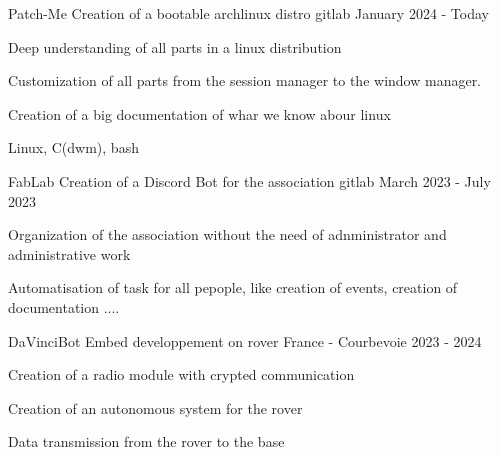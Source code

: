 

\begin{cventries}

	\cventry
	{Patch-Me} %
	{Creation of a bootable archlinux distro} %
	{gitlab} %
	{January 2024 - Today} %
	{
		\begin{cvitems} %
			\item {Deep  understanding of all parts in a linux distribution}
			\item {Customization of all parts from the session manager to the window manager.}
			\item {Creation of a big documentation of whar we know abour linux}
		\end{cvitems}
	}
	{
		\begin{cvitemsskills} %
			\item {Linux, C(dwm), bash}
		\end{cvitemsskills}
	}


	\cventry
	{FabLab} %
	{Creation of a Discord Bot for the association} %
	{gitlab} %
	{March 2023 - July 2023} %
	{
		\begin{cvitems} %
			\item {Organization of the association without the need of adnministrator and administrative work}
			\item {Automatisation of task for all pepople, like creation of events, creation of documentation ....}
		\end{cvitems}
	}
	{}

	\cventry
	{DaVinciBot} %
	{Embed developpement on rover} %
	{France - Courbevoie} %
	{2023 - 2024} %
	{
		\begin{cvitems} %
			\item {Creation of a radio module with crypted communication}
			\item {Creation of an autonomous system for the rover}
			\item {Data transmission from the rover to the base}
		\end{cvitems}
	}
	{}

\end{cventries}
